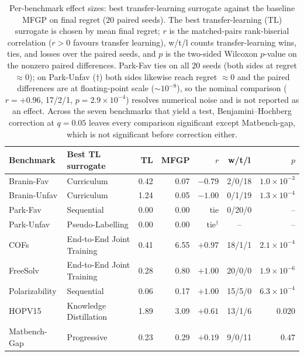 \documentclass[11pt,a4paper]{article}%
\begin{document}
\begin{table}[h]
\centering
\caption{Per-benchmark effect sizes: best transfer-learning surrogate against the
baseline MFGP on final regret ($20$ paired seeds). The best transfer-learning (TL)
surrogate is chosen by mean final regret; $r$ is the matched-pairs rank-biserial
correlation ($r > 0$ favours transfer learning), w/t/l counts transfer-learning
wins, ties, and losses over the paired seeds, and $p$ is the two-sided Wilcoxon
$p$-value on the nonzero paired differences. Park-Fav ties on all $20$ seeds (both
sides at regret $\approx 0$); on Park-Unfav ($\dag$) both sides likewise reach regret
$\approx 0$ and the paired differences are at floating-point scale ($\sim10^{-8}$), so
the nominal comparison ($r = +0.96$, 17/2/1, $p = 2.9\times10^{-4}$) resolves numerical
noise and is not reported as an effect. Across the seven benchmarks that yield a test,
Benjamini--Hochberg correction at $q = 0.05$ leaves every comparison significant except
Matbench-gap, which is not significant before correction either.}
\label{supptab:effect_sizes}
\begin{tabular}{llrrrcr}
\toprule
Benchmark & Best TL surrogate & TL & MFGP & $r$ & w/t/l & $p$ \\
\midrule
Branin-Fav & Curriculum & 0.42 & 0.07 & $-0.79$ & 2/0/18 & $1.0\times10^{-3}$ \\
Branin-Unfav & Curriculum & 1.24 & 0.05 & $-1.00$ & 0/1/19 & $1.3\times10^{-4}$ \\
Park-Fav & Sequential & 0.00 & 0.00 & tie & 0/20/0 & -- \\
Park-Unfav & Pseudo-Labelling & 0.00 & 0.00 & tie$^{\dag}$ & -- & -- \\
COFs & End-to-End Joint Training & 0.41 & 6.55 & $+0.97$ & 18/1/1 & $2.1\times10^{-4}$ \\
FreeSolv & End-to-End Joint Training & 0.28 & 0.80 & $+1.00$ & 20/0/0 & $1.9\times10^{-6}$ \\
Polarizability & Sequential & 0.06 & 0.17 & $+1.00$ & 15/5/0 & $6.3\times10^{-4}$ \\
HOPV15 & Knowledge Distillation & 1.89 & 3.09 & $+0.61$ & 13/1/6 & $0.020$ \\
Matbench-Gap & Progressive & 0.23 & 0.29 & $+0.19$ & 9/0/11 & $0.47$ \\
\bottomrule
\end{tabular}
\end{table}
\end{document}
